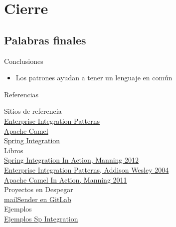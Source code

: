 \documentclass{beamer}
\begin{document}

\section{Cierre}
\subsection{Palabras finales}

\begin{frame}{Conclusiones}
\begin{itemize}
\item Los patrones ayudan a tener un lenguaje en común
\end{itemize}
\end{frame}

\begin{frame}{Referencias}
\begin{center}
Sitios de referencia\\
\href{http://www.eaipatterns.com/}{Enterprise Integration Patterns} \\
\href{http://camel.apache.org/}{Apache Camel} \\
\href{http://projects.spring.io/spring-integration/}{Spring Integration} \\
Libros \\
\href{https://www.dropbox.com/s/gwa5p1edxpgudcz/Manning.Spring.Integration.in.Action.Sep.2012.pdf}{Spring Integration In Action, Manning 2012}  \\
\href{https://www.dropbox.com/s/zd9uft4ygbclehn/Addison.Wesley.Enterprise.Integration.Patterns.pdf}{Enterprise Integration Patterns, Addison Wesley 2004} \\
\href{https://www.dropbox.com/s/gjfegd85cvih78a/Manning.Camel.in.Action.Dec.2010.pdf}{Apache Camel In Action, Manning 2011} \\
Proyectos en Despegar \\
\href{http://gitlab.despegar.it/mail-checker/mail-checker}{mailSender en GitLab} \\
Ejemplos \\
\href{https://github.com/spring-projects/spring-integration-samples}{Ejemplos Sp Integration}
\end{center}
\end{frame}
\end{document}
